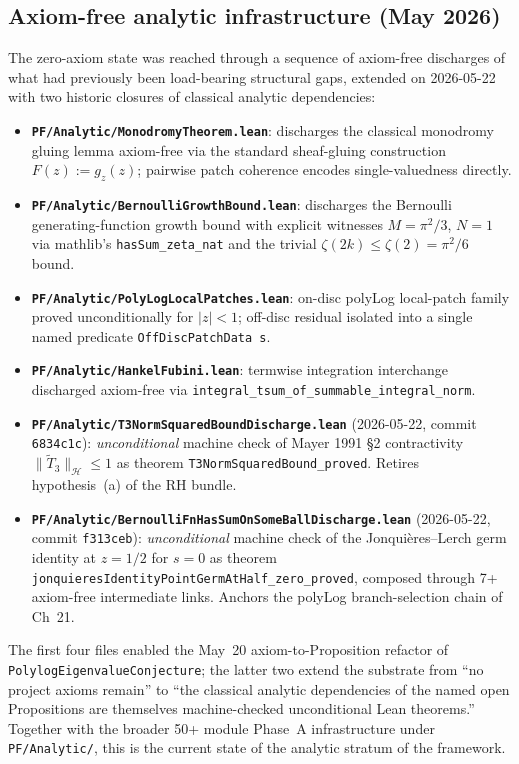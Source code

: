 \subsection{Axiom-free analytic infrastructure (May 2026)}

The zero-axiom state was reached through a sequence of axiom-free
discharges of what had previously been load-bearing structural gaps,
extended on 2026-05-22 with two historic closures of classical
analytic dependencies:

\begin{itemize}
\item \textbf{\texttt{PF/Analytic/MonodromyTheorem.lean}}: discharges
  the classical monodromy gluing lemma axiom-free via the standard
  sheaf-gluing construction $F(z) := g_z(z)$; pairwise patch
  coherence encodes single-valuedness directly.
\item \textbf{\texttt{PF/Analytic/BernoulliGrowthBound.lean}}:
  discharges the Bernoulli generating-function growth bound with
  explicit witnesses $M = \pi^2/3$, $N = 1$ via mathlib's
  \texttt{hasSum\_zeta\_nat} and the trivial $\zeta(2k) \leq \zeta(2)
  = \pi^2/6$ bound.
\item \textbf{\texttt{PF/Analytic/PolyLogLocalPatches.lean}}: on-disc
  polyLog local-patch family proved unconditionally for $|z| < 1$;
  off-disc residual isolated into a single named predicate
  \texttt{OffDiscPatchData s}.
\item \textbf{\texttt{PF/Analytic/HankelFubini.lean}}: termwise
  integration interchange discharged axiom-free via
  \texttt{integral\_tsum\_of\_summable\_integral\_norm}.
\item \textbf{\texttt{PF/Analytic/T3NormSquaredBoundDischarge.lean}}
  (2026-05-22, commit \texttt{6834c1c}): \emph{unconditional} machine
  check of Mayer 1991 \S2 contractivity $\|\tilde{T}_3\|_{\mathcal{H}}
  \leq 1$ as theorem \texttt{T3NormSquaredBound\_proved}. Retires
  hypothesis~(a) of the RH bundle.
\item \textbf{\texttt{PF/Analytic/BernoulliFnHasSumOnSomeBallDischarge.lean}}
  (2026-05-22, commit \texttt{f313ceb}): \emph{unconditional} machine
  check of the Jonqui\`{e}res--Lerch germ identity at $z = 1/2$ for
  $s = 0$ as theorem
  \texttt{jonquieresIdentityPointGermAtHalf\_zero\_proved},
  composed through 7+ axiom-free intermediate links. Anchors the
  polyLog branch-selection chain of Ch~21.
\end{itemize}

The first four files enabled the May~20 axiom-to-Proposition refactor
of \texttt{PolylogEigenvalueConjecture}; the latter two extend the
substrate from ``no project axioms remain'' to ``the classical
analytic dependencies of the named open Propositions are themselves
machine-checked unconditional Lean theorems.'' Together with the
broader 50+ module Phase~A infrastructure under \texttt{PF/Analytic/},
this is the current state of the analytic stratum of the framework.

